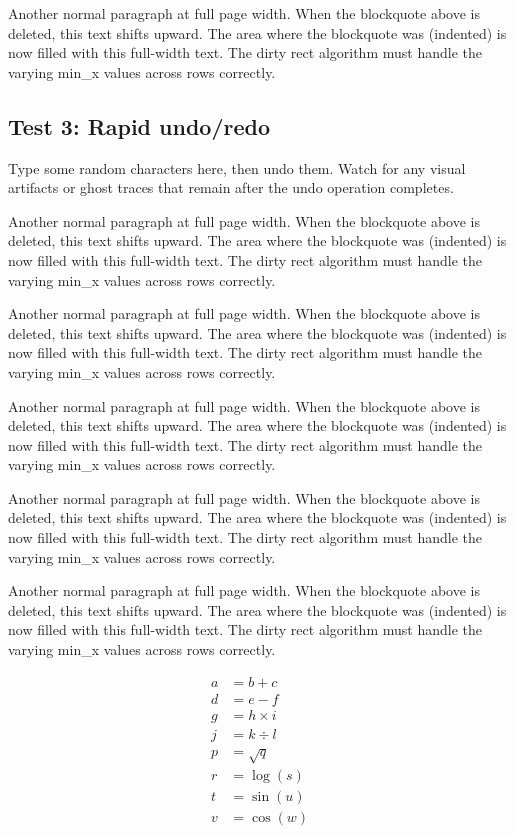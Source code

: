 \documentclass[12pt]{article}
\begin{document}
Another normal paragraph at full page width. When the blockquote above is
deleted, this text shifts upward. The area where the blockquote was (indented)
is now filled with this full-width text. The dirty rect algorithm must handle
the varying min\_x values across rows correctly.

\subsection{Test 3: Rapid undo/redo}

Type some random characters here, then undo them. Watch for any visual artifacts
or ghost traces that remain after the undo operation completes.

Another normal paragraph at full page width. When the blockquote above is
deleted, this text shifts upward. The area where the blockquote was (indented)
is now filled with this full-width text. The dirty rect algorithm must handle
the varying min\_x values across rows correctly.

Another normal paragraph at full page width. When the blockquote above is
deleted, this text shifts upward. The area where the blockquote was (indented)
is now filled with this full-width text. The dirty rect algorithm must handle
the varying min\_x values across rows correctly.

Another normal paragraph at full page width. When the blockquote above is
deleted, this text shifts upward. The area where the blockquote was (indented)
is now filled with this full-width text. The dirty rect algorithm must handle
the varying min\_x values across rows correctly.

Another normal paragraph at full page width. When the blockquote above is
deleted, this text shifts upward. The area where the blockquote was (indented)
is now filled with this full-width text. The dirty rect algorithm must handle
the varying min\_x values across rows correctly.

Another normal paragraph at full page width. When the blockquote above is
deleted, this text shifts upward. The area where the blockquote was (indented)
is now filled with this full-width text. The dirty rect algorithm must handle
the varying min\_x values across rows correctly.

\begin{subequations}
      \begin{align}
            a & = b + c      \\
            d & = e - f      \\
            g & = h \times i \\
            j & = k \div l   \\
            p & = \sqrt{q}   \\
            r & = \log(s)    \\
            t & = \sin(u)    \\
            v & = \cos(w)    \\
      \end{align}
\end{subequations}
\end{document}
